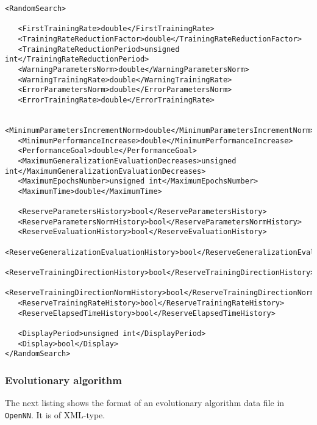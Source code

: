 \begin{lstlisting}
<RandomSearch>

   <FirstTrainingRate>double</FirstTrainingRate>
   <TrainingRateReductionFactor>double</TrainingRateReductionFactor>
   <TrainingRateReductionPeriod>unsigned int</TrainingRateReductionPeriod>
   <WarningParametersNorm>double</WarningParametersNorm>
   <WarningTrainingRate>double</WarningTrainingRate>
   <ErrorParametersNorm>double</ErrorParametersNorm>
   <ErrorTrainingRate>double</ErrorTrainingRate>
   
   <MinimumParametersIncrementNorm>double</MinimumParametersIncrementNorm>
   <MinimumPerformanceIncrease>double</MinimumPerformanceIncrease>
   <PerformanceGoal>double</PerformanceGoal>
   <MaximumGeneralizationEvaluationDecreases>unsigned int</MaximumGeneralizationEvaluationDecreases>
   <MaximumEpochsNumber>unsigned int</MaximumEpochsNumber>
   <MaximumTime>double</MaximumTime>
   
   <ReserveParametersHistory>bool</ReserveParametersHistory>
   <ReserveParametersNormHistory>bool</ReserveParametersNormHistory>
   <ReserveEvaluationHistory>bool</ReserveEvaluationHistory>
   <ReserveGeneralizationEvaluationHistory>bool</ReserveGeneralizationEvaluationHistory>
   <ReserveTrainingDirectionHistory>bool</ReserveTrainingDirectionHistory>
   <ReserveTrainingDirectionNormHistory>bool</ReserveTrainingDirectionNormHistory>
   <ReserveTrainingRateHistory>bool</ReserveTrainingRateHistory>
   <ReserveElapsedTimeHistory>bool</ReserveElapsedTimeHistory>
   
   <DisplayPeriod>unsigned int</DisplayPeriod>
   <Display>bool</Display>
</RandomSearch>

\end{lstlisting}

\subsubsection*{Evolutionary algorithm}

The next listing shows the format of an evolutionary algorithm data file in \texttt{OpenNN}. 
It is of XML-type. 

